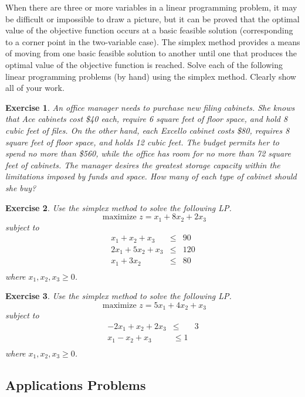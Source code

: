 \documentclass[letterpaper,10pt]{article}
\newtheorem{ex}{Exercise}
\begin{document}
When there are three or more variables in a linear programming problem, it may be difficult or impossible to draw a picture, but it can be proved that the optimal value of the objective function occurs at a basic feasible solution (corresponding to a corner point in the two-variable case). The simplex method provides a means of moving from one basic feasible solution to another until one that produces the optimal value of the objective function is reached.  Solve each of the following linear programming problems (by hand) using the simplex method.  Clearly show all of your work.

\begin{ex}
An office manager needs to purchase new filing cabinets. She knows that Ace cabinets cost \$40 each, require 6 square feet of floor space, and hold 8 cubic feet of files. On the other hand, each Excello cabinet costs \$80, requires 8 square feet of floor space, and holds 12 cubic feet. The budget permits her to spend no more than \$560, while the office has room for no more than 72 square feet of cabinets. The manager desires the greatest storage capacity within the limitations imposed by funds and space. How many of each type of cabinet should she buy?
\end{ex}


\begin{ex}
Use the simplex method to solve the following LP. $$\text{ maximize }z=x_1+8x_2+2x_3$$ subject to 
\begin{eqnarray*}
x_1+x_2+x_3&\leq&90\\
2x_1+5x_2+x_3&\leq&120\\
x_1+3x_2&\leq&80\\
\end{eqnarray*}
where $x_1,x_2,x_3\geq 0$.
\end{ex}



\begin{ex}
Use the simplex method to solve the following LP. $$\text{ maximize }z=5x_1+4x_2+x_3$$ subject to 
\begin{eqnarray*}
-2x_1+x_2+2x_3&\leq &3\\
x_1-x_2+x_3&\leq 1\\
\end{eqnarray*}
where $x_1,x_2,x_3\geq 0$.
\end{ex}





\subsection{Applications Problems}
\end{document}
